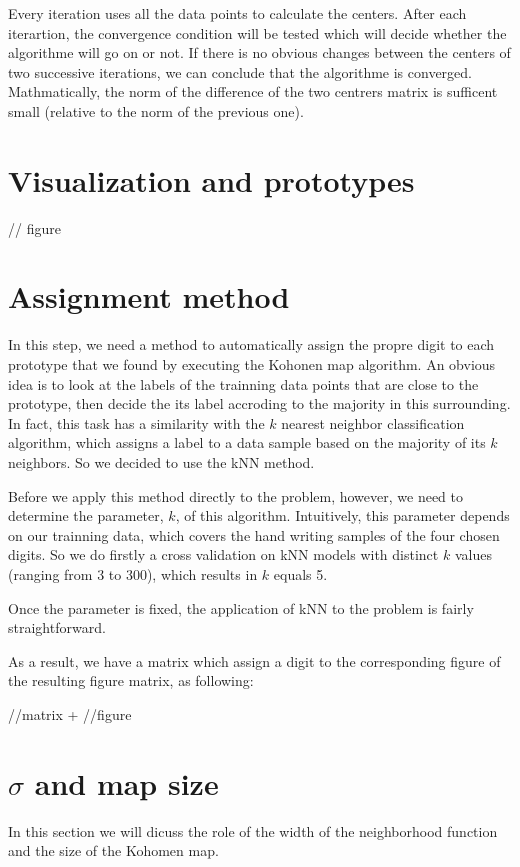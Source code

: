 \documentclass[a4paper, 12pt]{article}
\begin{document}
Every iteration uses all the data points to calculate the centers. After each iterartion, the convergence condition will be tested which will decide whether the algorithme will go on or not. If there is no obvious changes between the centers of two successive iterations, we can conclude that the algorithme is converged. Mathmatically, the norm of the difference of the two centrers matrix is sufficent small (relative to the norm of the previous one).

\section{Visualization and prototypes}
// figure

\section{Assignment method}
In this step, we need a method to automatically assign the propre
digit to each prototype that we found by executing the Kohonen map
algorithm. An obvious idea is to look at the labels of the trainning
data points that are close to the prototype, then decide the its label
accroding to the majority in this surrounding. In fact, this task has
a similarity with the $k$ nearest neighbor classification algorithm,
which assigns a label to a data sample based on the majority of its $k$
neighbors. So we decided to use the kNN method.

Before we apply this method directly to the problem, however, we need
to determine the parameter, $k$, of this algorithm. Intuitively, this
parameter depends on our trainning data, which covers the hand
writing samples of the four chosen digits. So we do firstly a cross
validation on kNN models with distinct $k$ values (ranging from 3 to 300),
which results in $k$ equals 5.

Once the parameter is fixed, the application of kNN to the problem is fairly straightforward.

As a result, we have a matrix which assign a digit to the corresponding figure of the resulting figure matrix, as following:

//matrix + //figure

\section{$\sigma$ and map size}
In this section we will dicuss the role of the width of the neighborhood function and the size of the Kohomen map. 
\end{document}
